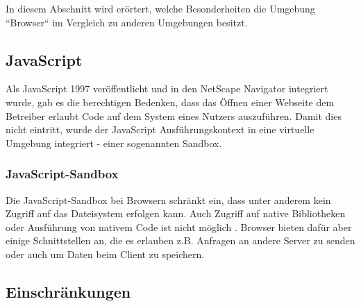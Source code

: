 
In diesem Abschnitt wird erörtert, welche Besonderheiten die Umgebung ``Browser`` im Vergleich zu anderen Umgebungen besitzt.

\subsection{JavaScript}

Als JavaScript 1997 veröffentlicht und in den NetScape Navigator integriert wurde, gab es die berechtigen Bedenken, dass das Öffnen einer Webseite dem Betreiber erlaubt Code auf dem System eines Nutzers auszuführen. Damit dies nicht eintritt, wurde der JavaScript Ausführungskontext in eine virtuelle Umgebung  integriert - einer sogenannten Sandbox. \cite{LearningJavaScript}


\subsubsection{JavaScript-Sandbox}

Die JavaScript-Sandbox bei Browsern schränkt ein, dass unter anderem kein Zugriff auf das Dateisystem erfolgen kann. Auch Zugriff auf native Bibliotheken oder Ausführung von nativem Code ist nicht möglich \cite{TheSpyInTheSandbox}. Browser bieten dafür aber einige Schnittstellen an, die es erlauben z.B. Anfragen an andere Server zu senden oder auch um Daten beim Client zu speichern.

%

\subsection{Einschränkungen}

